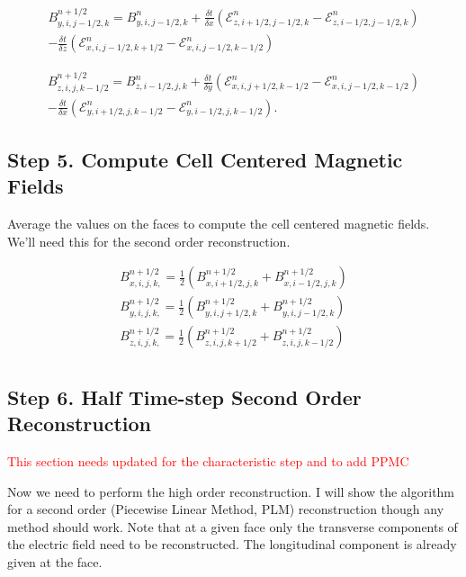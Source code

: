 $$
    \begin{aligned}
        B^{n+1/2}_{y,i,j-1/2,k} = B^{n}_{y,i,j-1/2,k}
        + \frac{\delta t}{\delta x} \left( \mathcal{E}^n_{z,i+1/2,j-1/2,k} - \mathcal{E}^n_{z,i-1/2,j-1/2,k} \right) \\
        - \frac{\delta t}{\delta z} \left( \mathcal{E}^n_{x,i,j-1/2,k+1/2} - \mathcal{E}^n_{x,i,j-1/2,k-1/2} \right)
    \end{aligned}
$$

$$
    \begin{aligned}
        B^{n+1/2}_{z,i,j,k-1/2} = B^{n}_{z,i-1/2,j,k}
        + \frac{\delta t}{\delta y} \left( \mathcal{E}^n_{x,i,j+1/2,k-1/2} - \mathcal{E}^n_{x,i,j-1/2,k-1/2} \right) \\
        - \frac{\delta t}{\delta x} \left( \mathcal{E}^n_{y,i+1/2,j,k-1/2} - \mathcal{E}^n_{y,i-1/2,j,k-1/2} \right).
    \end{aligned}
$$

\subsection{Step 5. Compute Cell Centered Magnetic Fields}

Average the values on the faces to compute the cell centered magnetic fields.
We'll need this for the second order reconstruction.

$$
    \begin{aligned}
        B^{n+1/2}_{x,i,j,k,} = \frac{1}{2} \left( B^{n+1/2}_{x,i+1/2,j,k} + B^{n+1/2}_{x,i-1/2,j,k} \right) \\
        B^{n+1/2}_{y,i,j,k,} = \frac{1}{2} \left( B^{n+1/2}_{y,i,j+1/2,k} + B^{n+1/2}_{y,i,j-1/2,k} \right) \\
        B^{n+1/2}_{z,i,j,k,} = \frac{1}{2} \left( B^{n+1/2}_{z,i,j,k+1/2} + B^{n+1/2}_{z,i,j,k-1/2} \right) \\
    \end{aligned}
$$

\subsection{Step 6. Half Time-step Second Order Reconstruction}

\textcolor{red}{This section needs updated for the characteristic step and to add PPMC}

Now we need to perform the high order reconstruction. I will show the algorithm for a second order (Piecewise Linear Method, PLM) reconstruction though any method should work. Note that at a given face only the transverse components of the electric field need to be reconstructed. The longitudinal component is already given at the face.

